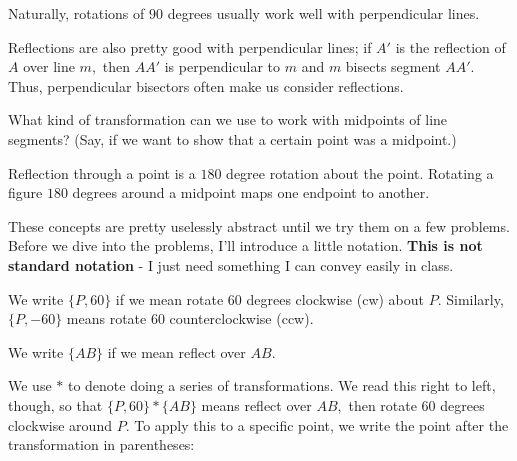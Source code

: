 

Naturally, rotations of $90$ degrees usually work well with perpendicular lines.

Reflections are also pretty good with perpendicular lines; if $A'$ is the reflection of $A$ over line $m,$ then $AA'$ is perpendicular to $m$ and $m$ bisects segment $AA'.$ Thus, perpendicular bisectors often make us consider reflections.

What kind of transformation can we use to work with midpoints of line segments?  (Say, if we want to show that a certain point was a midpoint.)




Reflection through a point is a $180$ degree rotation about the point.  Rotating a figure $180$ degrees around a midpoint maps one endpoint to another.

These concepts are pretty uselessly abstract until we try them on a few problems.  Before we dive into the problems, I'll introduce a little notation.  \textbf{This is not standard notation} - I just need something I can convey easily in class.

We write $\{P,60\}$ if we mean rotate $60$ degrees clockwise (cw) about $P.$ Similarly, $\{P,-60\}$ means rotate $60$ counterclockwise (ccw).

We write $\{AB\}$ if we mean reflect over $AB.$

We use $*$ to denote doing a series of transformations.  We read this right to left, though, so that $\{P,60\} * \{AB\}$ means reflect over $AB,$ then rotate $60$ degrees clockwise around $P.$ To apply this to a specific point, we write the point after the transformation in parentheses:

